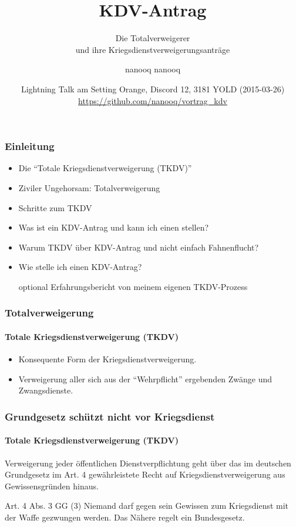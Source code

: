 \documentclass{beamer}
\title[KDV-Antrag] %
{KDV-Antrag}
\subtitle{Die Totalverweigerer \\und ihre Kriegsdienstverweigerungsanträge}
\author[nanooq nanooq] 
{nanooq nanooq}
\institute[Hackspace Siegen e.~V.] %
{
	\inst{1}%
	Hackspace Siegen e.~V.\\
	Effertsufer 104\\
	57072 Siegen
}
\date[2015-03-26] %
{Lightning Talk am Setting Orange, Discord 12, 3181 YOLD (2015-03-26)\\
	\href{https://github.com/nanooq/vortrag_kdv}{https://github.com/nanooq/vortrag\_kdv}}
\begin{document}
	
	\frame{\titlepage}
	
	\begin{frame}
	  	\frametitle{Einleitung}	  
	  	\begin{itemize}
	  		\item Die \enquote{Totale Kriegsdienstverweigerung (TKDV)}
	  		\item Ziviler Ungehorsam: Totalverweigerung
	  		\item Schritte zum TKDV
	  		\item Was ist ein KDV-Antrag und kann ich einen stellen?
	  		\item Warum TKDV über KDV-Antrag und nicht einfach Fahnenflucht?
	  		\item Wie stelle ich einen KDV-Antrag?
		  	\item[optional] Erfahrungsbericht von meinem eigenen TKDV-Prozess
	  	\end{itemize}		
	\end{frame}

	\begin{frame}
	  	\frametitle{Totalverweigerung}
	  	\framesubtitle{Totale Kriegsdienstverweigerung (TKDV)}
	  	\begin{itemize}
	  		\item Konsequente Form der Kriegsdienstverweigerung. 		
	  		\item Verweigerung aller sich aus der \enquote{Wehrpflicht} ergebenden Zwänge und Zwangsdienste. 
	  	\end{itemize}
  	\end{frame}
  	
  	\begin{frame}
	  	\frametitle{Grundgesetz schützt nicht vor Kriegsdienst}
	  	\framesubtitle{Totale Kriegsdienstverweigerung (TKDV)}
	  	
	  	Verweigerung jeder öffentlichen Dienstverpflichtung geht über das im deutschen Grundgesetz im Art. 4 gewährleistete Recht auf Kriegsdienstverweigerung aus Gewissensgründen hinaus.

	  	\begin{block}{Art. 4 Abs. 3 GG}
	  		(3) Niemand darf gegen sein Gewissen zum Kriegsdienst mit der Waffe gezwungen werden. Das Nähere regelt ein Bundesgesetz.
	  	\end{block}
  	\end{frame}
	
\end{document}
